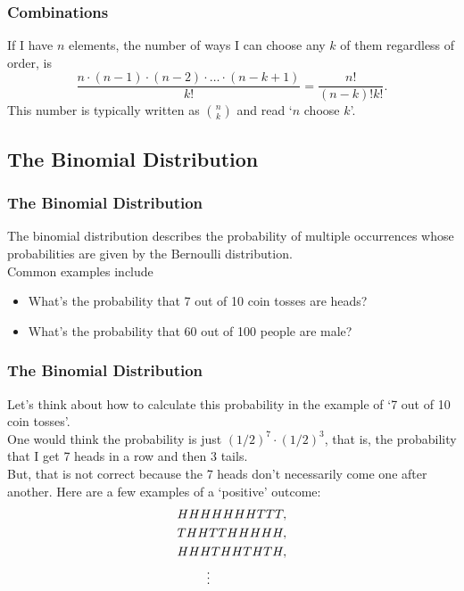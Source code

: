 \documentclass[aspectratio=169,11pt,usenames,dvipsnames]{beamer}
\begin{document}
\begin{frame}
 \frametitle{Combinations}
 \begin{tcolorbox}[title=Combinations]
  If I have $n$ elements, the number of ways I can choose any $k$ of them
  regardless of order, is
  \[
   \frac{n \cdot (n-1) \cdot (n-2) \cdot \ldots \cdot (n-k+1)}{k!} =
   \frac{n!}{(n-k)!k!}.
  \]
  This number is typically written as $\binom{n}{k}$ and read `\alert{$n$ choose
  $k$}'.
 \end{tcolorbox}
\end{frame}

\subsection{The Binomial Distribution}

\begin{frame}
 \subsectionpage
\end{frame}

\begin{frame}
 \frametitle{The Binomial Distribution}
 The \alert{binomial distribution} describes the probability of multiple
 occurrences whose probabilities are given by the Bernoulli distribution.\\
 \pause
 Common examples include
 \begin{itemize}
  \item What's the probability that 7 out of 10 coin tosses are heads?
  \item What's the probability that 60 out of 100 people are male?
 \end{itemize}
\end{frame}

\begin{frame}
 \frametitle{The Binomial Distribution}
 Let's think about how to calculate this probability in the example of `7 out of
 10 coin tosses'.\\ \pause
 One would think the probability is just $(1 / 2)^{7} \cdot (1 / 2)^{3}$, that
 is, the probability that I get 7 heads in a row and then 3 tails.\\ \pause
 But, that is \alert{not correct} because the 7 heads don't necessarily come one
 after another. \pause Here are a few examples of a `positive' outcome:
 \begin{align*}
  & HHHHHHHTTT,\\
  & THHTTHHHHH,\\
  & HHHTHHTHTH,\\
  & \hspace{5.5ex} \vdots
 \end{align*}
\end{frame}
\end{document}
